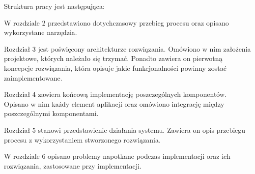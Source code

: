 
\vspace{0.5cm}
Struktura pracy jest następująca:

\noindent W rozdziale 2  przedstawiono dotychczasowy przebieg procesu oraz opisano wykorzystane narzędzia.

\noindent Rozdział 3 jest poświęcony architekturze rozwiązania. Omówiono w nim założenia projektowe, których należało się trzymać. Ponadto zawiera on pierwotną koncepcje rozwiązania, która opisuje jakie funkcjonalności powinny zostać zaimplementowane.

\noindent Rozdział 4 zawiera końcową implementację poszczególnych komponentów. Opisano w nim każdy element aplikacji oraz omówiono integrację między poszczególnymi komponentami.

\noindent Rozdział 5 stanowi przedstawienie działania systemu. Zawiera on opis przebiegu procesu z wykorzystaniem stworzonego rozwiązania.

\noindent W rozdziale 6 opisano problemy napotkane podczas implementacji oraz ich rozwiązania, zastosowane przy implementacji.

